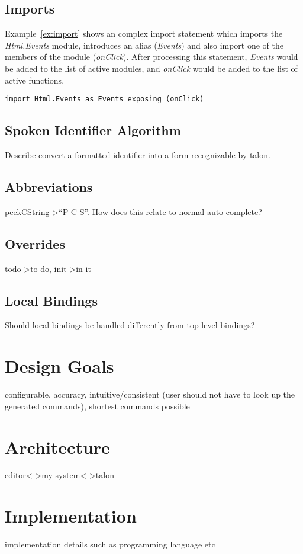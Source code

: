 \documentclass[../thesis.tex]{subfiles}
\begin{document}
\subsection{Imports}\label{imports}
Example~\ref{ex:import} shows an complex import statement which imports the \textit{Html.Events} module,
introduces an alias (\textit{Events}) and also import one of the members of the module (\textit{onClick}).
After processing this statement, \textit{Events} would be added to the list of active modules, 
and \textit{onClick} would be added to the list of active functions.

\begin{example}\label{ex:import}
\begin{verbatim}
import Html.Events as Events exposing (onClick)
\end{verbatim}
\end{example}

\subsection{Spoken Identifier Algorithm}\label{spoken_identifier_algorithm}
Describe convert a formatted identifier into a form recognizable by talon.

\subsection{Abbreviations}\label{abbreviations}
peekCString->``P C S''. How does this relate to normal auto complete?

\subsection{Overrides}\label{overrides}
todo->to do, init->in it

\subsection{Local Bindings}%
\label{sub:local_bindings}
Should local bindings be handled differently from top level bindings?


\section{Design Goals}%
\label{sec:design_goals}
configurable, accuracy, intuitive/consistent (user should not have to look up the generated commands), 
shortest commands possible

\section{Architecture}%
\label{sec:architecture}
editor<->my system<->talon

\section{Implementation}%
\label{sec:implementation}
implementation details such as programming language etc
\end{document}
